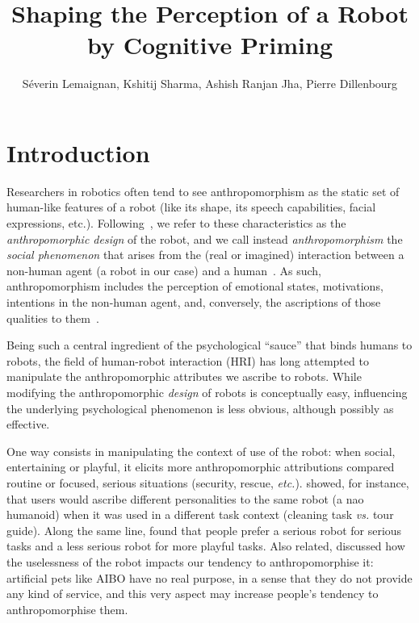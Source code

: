 \documentclass[lettersize, noapacite, twoside, HRI]{apa_HRI}
\title{Shaping the Perception of a Robot by Cognitive Priming}
\author{S\'everin Lemaignan, Kshitij Sharma, Ashish Ranjan Jha, Pierre
Dillenbourg}
\affiliation{CHILI Lab, \'Ecole Polytechnique F\'ed\'erale de Lausanne}
\newcommand{\etc}{\textit{etc.}\xspace}
\newcommand{\vs}{\textit{vs.}\xspace}
\begin{document}
\maketitle

\section{Introduction}

Researchers in robotics often tend to see anthropomorphism as the static set of
human-like features of a robot (like its shape, its speech capabilities, facial
expressions, etc.). Following~\citet{fink_anthropomorphism_2012}, we refer to
these characteristics as the \emph{anthropomorphic design} of the robot, and we
call instead \emph{anthropomorphism} the \emph{social phenomenon} that arises
from the (real or imagined) interaction between a non-human agent (a robot in
our case) and a human~\citep{persson_anthropomorphism_2000}. As such,
anthropomorphism includes the perception of emotional states, motivations,
intentions in the non-human agent, and, conversely, the ascriptions of those
qualities to them~\citep{epley_when_2008}.

Being such a central ingredient of the psychological ``sauce'' that binds humans to
robots, the field of human-robot interaction (HRI) has long
attempted to manipulate the anthropomorphic attributes we ascribe to robots.
While modifying the anthropomorphic \emph{design} of robots is conceptually
easy, influencing the underlying psychological phenomenon is less
obvious, although possibly as effective.

One way consists in manipulating the context of use of the robot: when social,
entertaining or playful, it elicits more anthropomorphic attributions compared
routine or focused, serious situations (security, rescue, \etc).
\citet{joosse_what_2013} showed, for instance, that users would ascribe
different personalities to the same robot (a {\sc nao} humanoid) when it was
used in a different task context (cleaning task \vs tour guide). Along the same
line, \citet{goetz_cooperation_2002} found that people prefer a serious robot
for serious tasks and a less serious robot for more playful tasks. Also related,
\citet{kaplan_free_2000} discussed how the uselessness of the robot impacts our
tendency to anthropomorphise it: artificial pets like AIBO have no real purpose,
in a sense that they do not provide any kind of service, and this very aspect
may increase people's tendency to anthropomorphise them.
\end{document}
